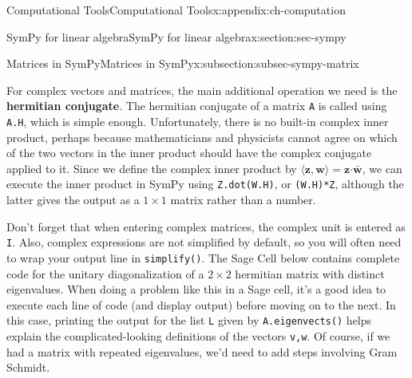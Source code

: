 \documentclass[oneside,10pt,]{book}
\newcommand{\mono}[1]{\texttt{#1}}
\newcommand{\terminology}[1]{\textbf{#1}}
\numberwithin{equation}{section}
\newenvironment{codedisplay}
{\VerbatimEnvironment\begin{center}\begin{lrbox}{\codedisplaybox}\begin{BVerbatim}}
{\end{BVerbatim}\end{lrbox}\usebox{\codedisplaybox}\end{center}}
\newcommand{\dotp}{\!\boldsymbol{\cdot}\!}
\newcommand{\zz}{\mathbf{z}}
\newcommand{\ww}{\mathbf{w}}
\begin{document}
\begin{appendixptx}{Computational Tools}{}{Computational Tools}{}{}{x:appendix:ch-computation}
\begin{sectionptx}{SymPy for linear algebra}{}{SymPy for linear algebra}{}{}{x:section:sec-sympy}
\begin{subsectionptx}{Matrices in SymPy}{}{Matrices in SymPy}{}{}{x:subsection:subsec-sympy-matrix}
%
\par
For complex vectors and matrices, the main additional operation we need is the \terminology{hermitian conjugate}. The hermitian conjugate of a matrix \mono{A} is called using \mono{A.H}, which is simple enough. Unfortunately, there is no built-in complex inner product, perhaps because mathematicians and physicists cannot agree on which of the two vectors in the inner product should have the complex conjugate applied to it. Since we define the complex inner product by \(\langle \zz,\ww\rangle = \zz\dotp\bar{\ww}\), we can execute the inner product in SymPy using \mono{Z.dot(W.H)}, or \mono{(W.H)*Z}, although the latter gives the output as a \(1\times 1\) matrix rather than a number.%
\par
Don't forget that when entering complex matrices, the complex unit is entered as \mono{I}. Also, complex expressions are not simplified by default, so you will often need to wrap your output line in \mono{simplify()}. The Sage Cell below contains complete code for the unitary diagonalization of a \(2\times 2\) hermitian matrix with distinct eigenvalues. When doing a problem like this in a Sage cell, it's a good idea to execute each line of code (and display output) before moving on to the next. In this case, printing the output for the list \mono{L} given by \mono{A.eigenvects()} helps explain the complicated-looking definitions of the vectors \mono{v,w}. Of course, if we had a matrix with repeated eigenvalues, we'd need to add steps involving Gram Schmidt.%

\end{subsectionptx}
\end{sectionptx}
\end{appendixptx}
\end{document}
